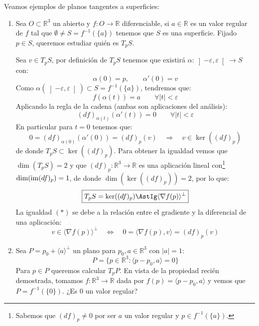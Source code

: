 \begin{ejemplo} 
    Veamos ejemplos de planos tangentes a superficies:
    \begin{enumerate}
        \item Sea $O\subset \mathbb{R}^3$ un abierto y $f:O\to\mathbb{R}$ diferenciable, si $a\in \mathbb{R}$ es un valor regular de $f$ tal que $\emptyset  \neq S = f^{-1}(\{a\})$ tenemos que $S$ es una superficie. Fijado $p\in S$, queremos estudiar quién es $T_pS$.

            Sea $v\in T_pS$, por definición de $T_pS$ tenemos que existirá $\alpha:\left]-\varepsilon,\varepsilon\right[\to S$ con:
            \begin{equation*}
                \alpha(0) = p, \qquad \alpha'(0)=v
            \end{equation*}
            Como $\alpha(\left]-\varepsilon,\varepsilon\right[)\subset S = f^{-1}(\{a\})$, tendremos que:
            \begin{equation*}
                f(\alpha(t)) = a \qquad \forall |t|<\varepsilon
            \end{equation*}
            Aplicando la regla de la cadena (ambas son aplicaciones del análisis):
            \begin{equation*}
                (d f)_{\alpha(t)}(\alpha'(t)) = 0 \qquad \forall |t|<\varepsilon
            \end{equation*}
            En particular para $t=0$ tenemos que:
            \begin{equation*}
                0 = (d f)_{\alpha(0)}(\alpha'(0)) = (d f)_p(v) \quad\Longrightarrow\quad v\in \ker((d f)_p)
            \end{equation*}
            de donde $T_pS\subset \ker((d f)_p)$. Para obtener la igualdad vemos que $\dim(T_pS) = 2$ y que $(d f)_p:\mathbb{R}^3\to\mathbb{R}$ es una aplicación lineal con\footnote{Sabemos que $(d f)_p\neq 0$ por ser $a$ un valor regular y $p\in f^{-1}(\{a\})$.} $\dim(\operatorname{im} (d f)_p) = 1$, de donde $\dim(\ker((d f)_p)) = 2$, por lo que:
            \begin{equation*}
                \boxed{T_pS = \ker((d f)_p) \AstIg \langle \nabla f(p) \rangle^\perp}
            \end{equation*}
            La igualdad $(\ast)$ se debe a la relación entre el gradiente y la diferencial de una aplicación:
            \begin{equation*}
                v\in \langle \nabla f(p) \rangle^\perp \quad\Longleftrightarrow\quad 0 = \langle \nabla f(p),v \rangle = (d f)_p(v)
            \end{equation*}
        \item[1a.] Sea $P = p_0+\langle a \rangle^\perp $ un plano para $p_0,a\in \mathbb{R}^3$ con $|a| =1$:
            \begin{equation*}
                P = \{p\in \mathbb{R}^3  : \langle p-p_0,a \rangle = 0\} 
            \end{equation*}
            Para $p\in P$ queremos calcular $T_pP$. En vista de la propiedad recién demostrada, tomamos $f:\mathbb{R}^3\to\mathbb{R}$ dada por $f(p) = \langle p-p_0,a \rangle $ y vemos que $P = f^{-1}(\{0\})$. ¿Es $0$ un valor regular?


\end{enumerate}
\end{ejemplo}
